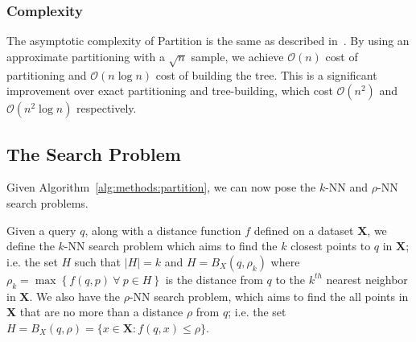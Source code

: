 

\subsubsection{Complexity}
\label{sec:methods:clustering:complexity}

The asymptotic complexity of Partition is the same as described in~\cite{ishaq2019clustered}.
By using an approximate partitioning with a $\sqrt{n}$ sample, we achieve $\mathcal{O}(n)$ cost of partitioning and $\mathcal{O}(n \log n)$ cost of building the tree.
This is a significant improvement over exact partitioning and tree-building, which cost $\mathcal{O}(n^2)$ and $\mathcal{O}(n^2 \log n)$ respectively.


\subsection{The Search Problem}
\label{sec:methods:the-search-problem}

Given Algorithm~\ref{alg:methods:partition}, we can now pose the $k$-NN and $\rho$-NN search problems.

Given a query $q$, along with a distance function $f$ defined on a dataset $\textbf{X}$, we define the $k$-NN search problem which aims to find the $k$ closest points to $q$ in $\textbf{X}$;
i.e. the set $H$ such that $|H| = k$ and $H = B_X(q, \rho_k)$ where $\rho_k = \max \left\{ f(q, p) \ \forall \ p \in H \right\}$ is the distance from $q$ to the $k^{th}$ nearest neighbor in $\textbf{X}$.
We also have the $\rho$-NN search problem, which aims to find the all points in $\textbf{X}$ that are no more than a distance $\rho$ from $q$;
i.e. the set $H = B_X(q, \rho) = \{x \in \textbf{X}: f(q, x) \leq \rho \}$.

